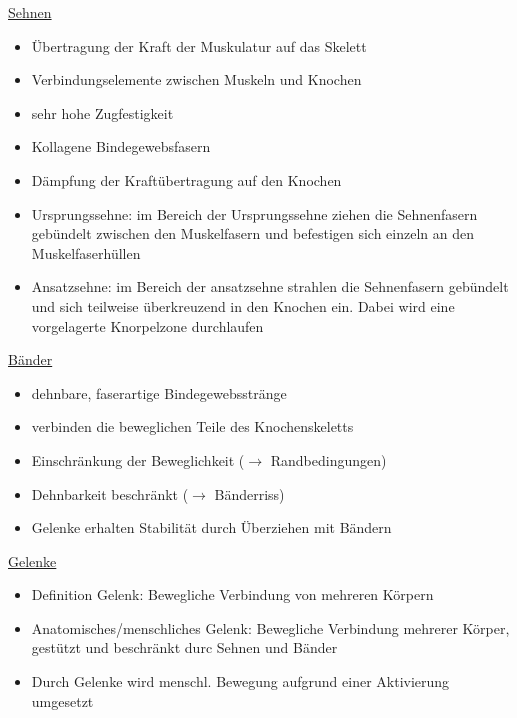 \documentclass[a4paper,10pt,oneside]{article}
\begin{document}
\underline{Sehnen} \\
	\begin{itemize}
		\item Übertragung der Kraft der Muskulatur auf das Skelett
		\item Verbindungselemente zwischen Muskeln und Knochen
		\item sehr hohe Zugfestigkeit
		\item Kollagene Bindegewebsfasern
		\item Dämpfung der Kraftübertragung auf den Knochen
		\item Ursprungssehne: im Bereich der Ursprungssehne ziehen die Sehnenfasern gebündelt zwischen den Muskelfasern und befestigen sich einzeln an den Muskelfaserhüllen
		\item Ansatzsehne: im Bereich der ansatzsehne strahlen die Sehnenfasern gebündelt und sich teilweise überkreuzend in den Knochen ein. Dabei wird eine vorgelagerte Knorpelzone durchlaufen
	\end{itemize}
	

\underline{Bänder} \\
	\begin{itemize}
		\item dehnbare, faserartige Bindegewebsstränge
		\item verbinden die beweglichen Teile des Knochenskeletts
		\item Einschränkung der Beweglichkeit ($\rightarrow$ Randbedingungen)
		\item Dehnbarkeit beschränkt ($\rightarrow$ Bänderriss)
		\item Gelenke erhalten Stabilität durch Überziehen mit Bändern
	\end{itemize}
 		
\underline{Gelenke} \\
	\begin{itemize}
		\item Definition Gelenk: Bewegliche Verbindung von mehreren Körpern
		\item Anatomisches/menschliches Gelenk: Bewegliche Verbindung mehrerer Körper, gestützt und beschränkt durc Sehnen und Bänder
		\item Durch Gelenke wird menschl. Bewegung aufgrund einer Aktivierung umgesetzt
	\end{itemize}
	
\end{document}

